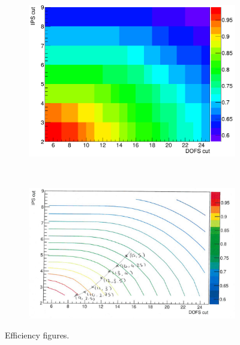 \begin{figure}
    \centering
    \begin{subfigure}[b]{0.4\textwidth}
        \includegraphics[width=\textwidth]{./Figs/Selection/strip_chart.png}
        \caption{ }
        \label{fig:eff}
    \end{subfigure}
    ~ %
    \begin{subfigure}[b]{0.4\textwidth}
        \includegraphics[width=\textwidth]{./Figs/Selection/strip_chart1.png}
        \caption{ }
        \label{fig:eff_contours}
    \end{subfigure}
    \caption{Efficiency figures.}
    \label{fig:efficiencyplots}
\end{figure}


